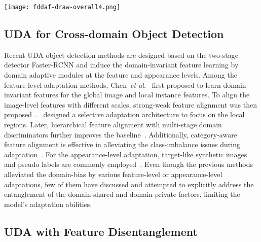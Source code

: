 \documentclass[journal]{IEEEtran}
\begin{document}
\begin{figure*}[t]
\centering
\texttt{[image: fddaf-draw-overall4.png]} \caption{}
\label{fig-overall}
\end{figure*}


\subsection{UDA for Cross-domain Object Detection}

Recent UDA object detection methods are designed based on the two-stage detector Faster-RCNN and induce the domain-invariant feature learning by domain adaptive modules at the feature and appearance levels. Among the feature-level adaptation methods, Chen~\emph{et al.}~\cite{chen2018domain} first proposed to learn domain-invariant features for the global image and local instance features. To align the image-level features with different scales, strong-weak feature alignment was then proposed~\cite{saito2019strong}.~\cite{zhu2019adapting} designed a selective adaptation architecture to focus on the local regions. Later, hierarchical feature alignment with multi-stage domain discriminators further improves the baseline~\cite{he2019multi,chen2020harmonizing,shen2020cdtd}. Additionally, category-aware feature alignment is effective in alleviating the class-imbalance issues during adaptation~\cite{xu2020exploring,zhuang2020ifan,xu2020cross,zheng2020cross}. {} For the appearance-level adaptation, target-like synthetic images and pseudo labels are commonly employed~\cite{inoue2018cross,kim2019diversify}. Even though the previous methods alleviated the domain-bias by various feature-level or appearance-level adaptations, few of them have discussed and attempted to explicitly address the entanglement of the domain-shared and domain-private factors, limiting the model's adaptation abilities. 



\subsection{UDA with Feature Disentanglement}
\end{document}
